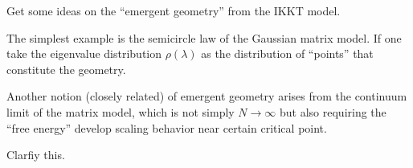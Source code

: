 \begin{todo}
Get some ideas on the ``emergent geometry'' from the IKKT model.	
\end{todo}

The simplest example is
the semicircle law of the Gaussian matrix model.
If one take the eigenvalue distribution $\rho(\lambda)$
as the distribution of ``points'' that constitute the geometry.

\begin{question}
Another notion (closely related) of emergent geometry arises from
the continuum limit of the matrix model,
which is not simply $N\to\infty$ but also requiring the ``free energy''
develop scaling behavior near certain critical point.

Clarfiy this.
\end{question}










